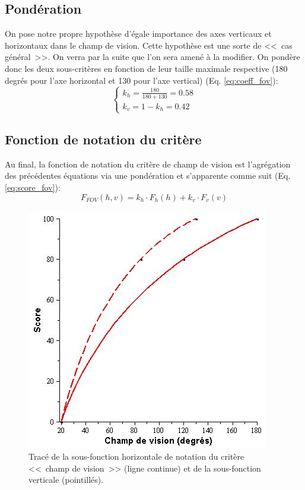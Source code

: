 	\subsection{Pondération}
	\par On pose notre propre hypothèse d'égale importance des axes verticaux et horizontaux dans le champ de vision. Cette hypothèse est une sorte de <<~cas général~>>. On verra par la suite que l'on sera amené à la modifier. On pondère donc les deux sous-critères en fonction de leur taille maximale respective (180 degrés pour l'axe horizontal et 130 pour l'axe vertical) (Eq. \ref{eq:coeff_fov}):
	\begin{equation}
		\begin{cases}	
			k_h = \frac{180}{180 + 130} = 0.58\\
			k_v = 1 - k_h = 0.42
		\end{cases}
		\label{eq:coeff_fov}
	\end{equation}
	
	\subsection{Fonction de notation du critère}
	\par Au final, la fonction de notation du critère de champ de vision est l'agrégation des précédentes équations via une pondération et s'apparente comme suit (Eq. \ref{eq:score_fov}):
	\begin{equation}
	F_{FOV}(h,v) = k_h \cdot F_h(h) + k_v \cdot F_v(v)
	\label{eq:score_fov}
	\end{equation}

	\begin{figure}
		\centering
		\includegraphics[scale=.75]{Figures/FOV}
		\caption{Tracé de la sous-fonction horizontale de notation du critère <<~champ de vision~>> (ligne continue) et de la sous-fonction verticale (pointillés).}
		\label{fig:score_fov}
	\end{figure}
	
